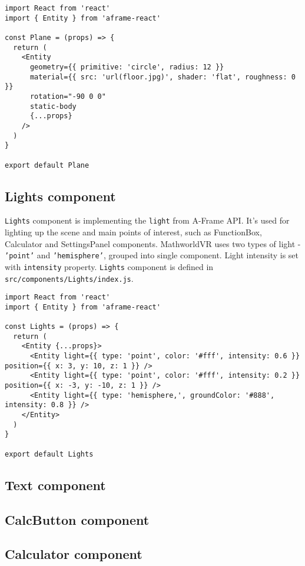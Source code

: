 \begin{lstlisting}[caption={\textsl{Plane} component code.},captionpos=b]
import React from 'react'
import { Entity } from 'aframe-react'

const Plane = (props) => {
  return (
    <Entity
      geometry={{ primitive: 'circle', radius: 12 }}
      material={{ src: 'url(floor.jpg)', shader: 'flat', roughness: 0 }}
      rotation="-90 0 0"
      static-body
      {...props}
    />
  )
}

export default Plane
\end{lstlisting}

\subsection{Lights component}
\texttt{Lights} component is implementing the \texttt{light} from A-Frame API. It's used for lighting up the scene and main points of interest, such as FunctionBox, Calculator and SettingsPanel components. MathworldVR uses two types of light - \texttt{'point'} and \texttt{'hemisphere'}, grouped into single component. Light intensity is set with \texttt{intensity} property. \texttt{Lights} component is defined in \texttt{src/components/Lights/index.js}.

\begin{lstlisting}[caption={\textsl{Lights} component code.},captionpos=b]
import React from 'react'
import { Entity } from 'aframe-react'

const Lights = (props) => {
  return (
    <Entity {...props}>
      <Entity light={{ type: 'point', color: '#fff', intensity: 0.6 }} position={{ x: 3, y: 10, z: 1 }} />
      <Entity light={{ type: 'point', color: '#fff', intensity: 0.2 }} position={{ x: -3, y: -10, z: 1 }} />
      <Entity light={{ type: 'hemisphere,', groundColor: '#888', intensity: 0.8 }} />
    </Entity>
  )
}

export default Lights
\end{lstlisting}

\subsection{Text component}

\subsection{CalcButton component}

\subsection{Calculator component}
